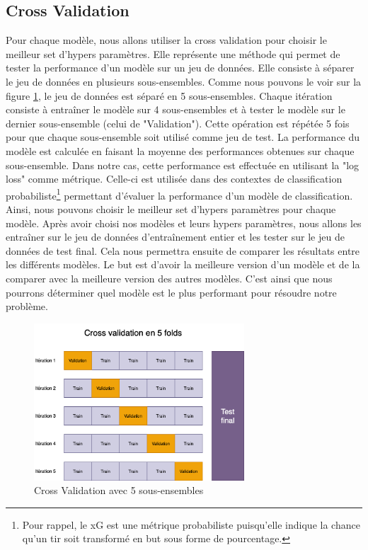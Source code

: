\documentclass[12pt]{article}
\begin{document}
\subsection{Cross Validation}
\label{sec:cross_validation}
Pour chaque modèle, nous allons utiliser la cross validation pour choisir le meilleur set d'hypers paramètres.
Elle représente une méthode qui permet de tester la performance d'un modèle sur un jeu de données.
Elle consiste à séparer le jeu de données en plusieurs sous-ensembles.
Comme nous pouvons le voir sur la figure \ref{fig:cross_validation}, le jeu de données est séparé en 5 sous-ensembles.
Chaque itération consiste à entraîner le modèle sur 4 sous-ensembles et à tester le modèle sur le dernier sous-ensemble (celui de "Validation").
Cette opération est répétée 5 fois pour que chaque sous-ensemble soit utilisé comme jeu de test.
La performance du modèle est calculée en faisant la moyenne des performances obtenues sur chaque sous-ensemble.
Dans notre cas, cette performance est effectuée en utilisant la "log loss" comme métrique.
Celle-ci est utilisée dans des contextes de classification probabiliste\footnote{Pour rappel, le xG est une métrique probabiliste puisqu'elle indique la chance qu'un tir soit transformé en but sous forme de pourcentage.} permettant d'évaluer la performance d'un modèle de classification.
Ainsi, nous pouvons choisir le meilleur set d'hypers paramètres pour chaque modèle.
\newline\newline
Après avoir choisi nos modèles et leurs hypers paramètres, nous allons les entraîner sur le jeu de données d'entraînement entier et les tester sur le jeu de données de test final.
Cela nous permettra ensuite de comparer les résultats entre les différents modèles.
Le but est d'avoir la meilleure version d'un modèle et de la comparer avec la meilleure version des autres modèles. 
C'est ainsi que nous pourrons déterminer quel modèle est le plus performant pour résoudre notre problème.
\begin{figure}[htp]
    \centering
    \includegraphics[width=0.7\textwidth]{img/cross_validation_schema.png}
    \caption{Cross Validation avec 5 sous-ensembles}
    \label{fig:cross_validation}
\end{figure}
\newpage
\end{document}
